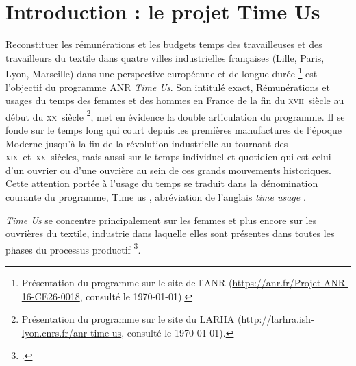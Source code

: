 \section*{Introduction : le projet Time Us}

\bigbreak

\og Reconstituer les rémunérations et les budgets temps des travailleuses et des travailleurs du textile dans quatre villes industrielles françaises (Lille, Paris, Lyon, Marseille) dans une perspective européenne et de longue durée \fg{}\footnote{Présentation du programme sur le site de l'ANR (\url{https://anr.fr/Projet-ANR-16-CE26-0018}, consulté le \today).} est l'objectif du programme ANR \textit{Time Us}. Son intitulé exact, \og Rémunérations et usages du temps des femmes et des hommes en France de la fin du \textsc{xvii}\ieme ~siècle au début du \textsc{xx}\ieme ~siècle \fg{}\footnote{Présentation du programme sur le site du LARHA (\url{http://larhra.ish-lyon.cnrs.fr/anr-time-us}, consulté le \today).}, met en évidence la double articulation du programme. Il se fonde sur le temps long qui court depuis les premières manufactures de l'époque Moderne jusqu'à la fin de la révolution industrielle au tournant des \textsc{xix}\ieme  ~et~\textsc{xx}\ieme ~siècles, mais aussi sur le temps individuel et quotidien qui est celui d'un ouvrier ou d'une ouvrière au sein de ces grands mouvements historiques. Cette attention portée à l'usage du temps se traduit dans la dénomination courante du programme, \og Time us \fg{}, abréviation de l'anglais \og \textit{time usage} \fg{}.

\textit{Time Us} se concentre principalement sur les femmes et plus encore sur les ouvrières du textile, industrie dans laquelle \og elles sont présentes dans toutes les phases du processus productif \fg{}\footnote{\cite[p. 1]{inria}.}.

